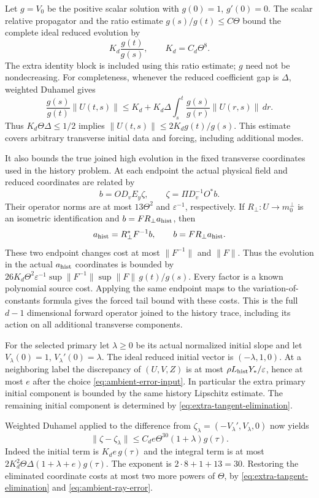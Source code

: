 Let $g=V_0$ be the positive scalar solution with $g(0)=1$, $g'(0)=0$.
The scalar relative propagator and the ratio estimate
$g(s)/g(t)\leq C\Theta$ bound the complete ideal reduced evolution by
\[
 K_d\frac{g(t)}{g(s)},\qquad K_d=C_d\Theta^8 .
\]
The extra identity block is included using this ratio estimate;
$g$ need not be nondecreasing. For completeness, whenever the reduced
coefficient gap is $\Delta$, weighted Duhamel gives
\[
 \frac{g(s)}{g(t)}\|U(t,s)\|
 \leq K_d+K_d\Delta
       \int_s^t\frac{g(s)}{g(r)}\|U(r,s)\|\,dr .
\]
Thus $K_d\Theta\Delta\leq1/2$ implies
$\|U(t,s)\|\leq2K_dg(t)/g(s)$.
This estimate covers arbitrary transverse initial data and forcing,
including additional modes.

It also bounds the true joined high evolution in the fixed transverse
coordinates used in the history problem. At each endpoint the actual
physical field and reduced coordinates are related by
\[
 b=O D_vE_y\zeta,\qquad
 \zeta=\Pi D_v^{-1}O^*b.
\]
Their operator norms are at most $13\Theta^2$ and
$\varepsilon^{-1}$, respectively. If $R_\perp:U\to m_0^\perp$
is an isometric identification and $b=F R_\perp a_{\rm hist}$, then
\[
 a_{\rm hist}=R_\perp^*F^{-1}b,\qquad
 b=F R_\perp a_{\rm hist}.
\]
These two endpoint changes cost at most $\|F^{-1}\|$ and $\|F\|$.
Thus the evolution in the actual $a_{\rm hist}$ coordinates is bounded
by $26K_d\Theta^2\varepsilon^{-1}
\sup\|F^{-1}\|\sup\|F\|\,g(t)/g(s)$.
Every factor is a known polynomial source cost. Applying the same
endpoint maps to the variation-of-constants formula gives the forced
tail bound with these costs. This is the full $d-1$ dimensional
forward operator joined to the history trace, including its action
on all additional transverse components.

For the selected primary let $\lambda\geq0$ be its actual normalized
initial slope and let $V_\lambda(0)=1$, $V_\lambda'(0)=\lambda$.
The ideal reduced initial vector is $(-\lambda,1,0)$.
At a neighboring label the discrepancy of $(U,V,Z)$ is at most
$\rho L_{\rm hist}Y_*/\varepsilon$, hence at most $e$ after the choice
\eqref{eq:ambient-error-input}. In particular the extra primary
initial component is bounded by the same history Lipschitz estimate. The remaining initial component is
determined by \eqref{eq:extra-tangent-elimination}.

Weighted Duhamel applied to the difference from
$\zeta_\lambda=(-V_\lambda',V_\lambda,0)$ now yields
\begin{equation}\label{eq:ambient-primary-relative}
 \|\zeta-\zeta_\lambda\|
 \leq C_de\Theta^{30}(1+\lambda)g(\tau).
\end{equation}
Indeed the initial term is $K_de\,g(\tau)$ and the integral term is
at most $2K_d^2\Theta\Delta(1+\lambda+e)g(\tau)$.
The exponent is $2\cdot8+1+13=30$.
Restoring the eliminated coordinate costs at most two more powers
of $\Theta$, by \eqref{eq:extra-tangent-elimination} and
\eqref{eq:ambient-ray-error}.

